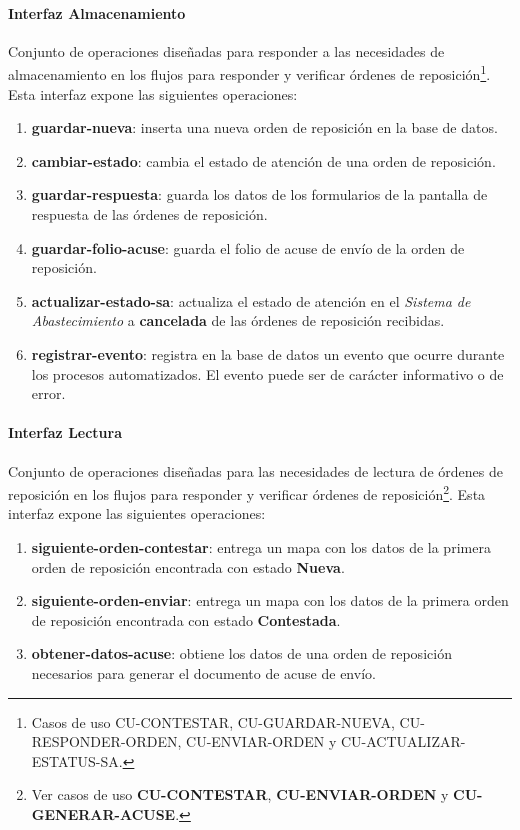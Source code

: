 \paragraph{\indent Interfaz Almacenamiento\\}
Conjunto de operaciones diseñadas para responder a las necesidades de almacenamiento en los flujos para responder y verificar órdenes de reposición\footnote{Casos de uso CU-CONTESTAR, CU-GUARDAR-NUEVA, CU-RESPONDER-ORDEN, CU-ENVIAR-ORDEN y CU-ACTUALIZAR-ESTATUS-SA.}. Esta interfaz expone las siguientes operaciones:
\begin{enumerate}
	\item \textbf{guardar-nueva}: inserta una nueva orden de reposición en la base de datos.
	\item \textbf{cambiar-estado}: cambia el estado de atención de una orden de reposición.
	\item \textbf{guardar-respuesta}: guarda los datos de los formularios de la pantalla de respuesta de las órdenes de reposición.
	\item \textbf{guardar-folio-acuse}: guarda el folio de acuse de envío de la orden de reposición.
	\item \textbf{actualizar-estado-sa}: actualiza el estado de atención en el \textit{Sistema de Abastecimiento} a \textbf{cancelada} de las órdenes de reposición recibidas.
	\item \textbf{registrar-evento}: registra en la base de datos un evento que ocurre durante los procesos automatizados. El evento puede ser de carácter informativo o de error.
\end{enumerate}

\paragraph{\indent Interfaz Lectura\\}
Conjunto de operaciones diseñadas para las necesidades de lectura de órdenes de reposición en los flujos para responder y verificar órdenes de reposición\footnote{Ver casos de uso \textbf{CU-CONTESTAR}, \textbf{CU-ENVIAR-ORDEN} y \textbf{CU-GENERAR-ACUSE}.}. Esta interfaz expone las siguientes operaciones:
\begin{enumerate}
	\item \textbf{siguiente-orden-contestar}: entrega un mapa con los datos de la primera orden de reposición encontrada con estado \textbf{Nueva}.
	\item \textbf{siguiente-orden-enviar}: entrega un mapa con los datos de la primera orden de reposición encontrada con estado \textbf{Contestada}.
	\item \textbf{obtener-datos-acuse}: obtiene los datos de una orden de reposición necesarios para generar el documento de acuse de envío.
\end{enumerate}

